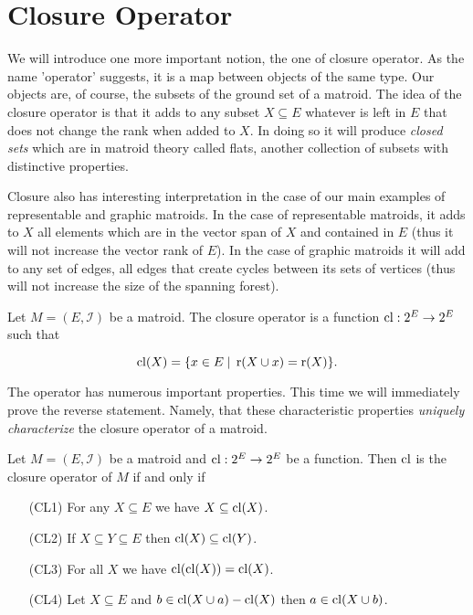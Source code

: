 
\newpage
\section{Closure Operator}


We will introduce one more important notion, the one of closure operator. As the name 'operator' suggests, it is a map between objects of the same type. Our objects are, of course, the subsets of the ground set of a matroid. The idea of the closure operator is that it adds to any subset $X \subseteq E$ whatever is left in $E$ that does not change the rank when added to $X$. In doing so it will produce \textit{closed sets} which are in matroid theory called flats, another collection of subsets with distinctive properties. 

Closure also has interesting interpretation in the case of our main examples of representable and graphic matroids. In the case of representable matroids, it adds to $X$ all elements which are in the vector span of $X$ and contained in $E$ (thus it will not increase the vector rank of $E$). In the case of graphic matroids it will add to any set of edges, all edges that create cycles between its sets of vertices (thus will not increase the size of the spanning forest).

\begin{defn}
    Let $M = (E, \mathcal{I})$ be a matroid. The closure operator is a function $\mathrm{cl}: 2^E \to 2^E$ such that

    $$\mathrm{cl}(X) = \{x \in E\; | \; \operatorname{r}(X \cup x) = \operatorname{r}(X) \}.$$

    
\end{defn}

The operator has numerous important properties. This time we will immediately prove the reverse statement. Namely, that these characteristic properties \textit{uniquely characterize} the closure operator of a matroid.

\begin{theorem}
Let $M = (E, \mathcal{I})$ be a matroid and $\mathrm{cl}: 2^E \to 2^E$ be a function. Then $\mathrm{cl}$ is the closure operator of $M$ if and only if

\begin{enumerate}
    \item[(CL1)] For any $X \subseteq E$ we have $X \subseteq \mathrm{cl} (X)$.
    \item[(CL2)] If $X \subseteq Y \subseteq E$ then $\mathrm{cl}(X) \subseteq \mathrm{cl}(Y)$.
    \item[(CL3)] For all $X$ we have $\mathrm{cl}(\mathrm{cl}(X)) = \mathrm{cl}(X)$.

    \item[(CL4)] Let $X \subseteq E$ and $b \in 
    \mathrm{cl}(X \cup a) - \mathrm{cl}(X)$ then $a \in \mathrm{cl}(X \cup b)$.
\end{enumerate}
\end{theorem}


